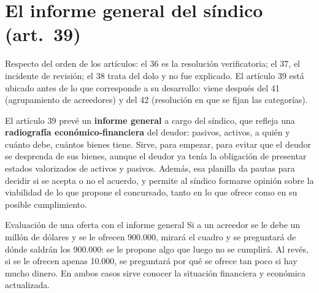 \documentclass[12pt,oneside]{book}
\begin{document}
\section{El informe general del síndico (art.\ 39)}

Respecto del orden de los artículos: el 36 es la resolución verificatoria; el 37, el incidente de revisión; el 38 trata del dolo y no fue explicado. El artículo 39 está ubicado antes de lo que corresponde a su desarrollo: viene después del 41 (agrupamiento de acreedores) y del 42 (resolución en que se fijan las categorías).

El artículo 39 prevé un \textbf{informe general} a cargo del síndico, que refleja una \textbf{radiografía económico-financiera} del deudor: pasivos, activos, a quién y cuánto debe, cuántos bienes tiene. Sirve, para empezar, para evitar que el deudor se desprenda de sus bienes, aunque el deudor ya tenía la obligación de presentar estados valorizados de activos y pasivos. Además, esa planilla da pautas para decidir si se acepta o no el acuerdo, y permite al síndico formarse opinión sobre la viabilidad de lo que propone el concursado, tanto en lo que ofrece como en su posible cumplimiento.

\begin{example}{Evaluación de una oferta con el informe general}
Si a un acreedor se le debe un millón de dólares y se le ofrecen 900.000, mirará el cuadro y se preguntará de dónde saldrán los 900.000: se le propone algo que luego no se cumplirá. Al revés, si se le ofrecen apenas 10.000, se preguntará por qué se ofrece tan poco si hay mucho dinero. En ambos casos sirve conocer la situación financiera y económica actualizada.
\end{example}
\end{document}
